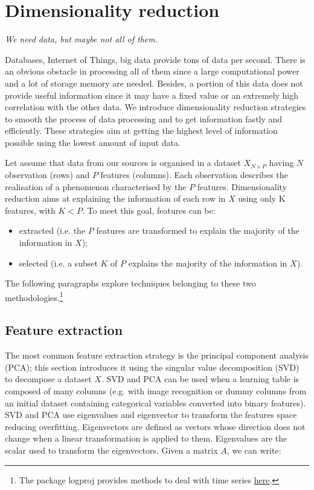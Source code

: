 \chapter{Dimensionality reduction}{}

\epigraph{\textit{We need data, but maybe not all of them.}}{}

Databases, Internet of Things, big data provide tons of data per second. There is an obvious obstacle in processing all of them since a large computational power and a lot of storage memory are needed. Besides, a portion of this data does not provide useful information since it may have a fixed value or an extremely high correlation with the other data. We introduce dimensionality reduction strategies to smooth the process of data processing and to get information fastly and efficiently. These strategies aim at getting the highest level of information possible using the lowest amount of input data.\par

Let assume that data from our sources is organised in a dataset $X_{N\times P}$ having $N$ observation (rows) and $P$ features (columns). Each observation describes the realisation of a phenomenon characterised by the $P$ features. Dimensionality reduction aims at explaining the information of each row in $X$ using only K features, with $K<P$. To meet this goal, features can be:

\begin{itemize}
    \item extracted (i.e. the $P$ features are transformed to explain the majority of the information in $X$);
    \item selected (i.e. a subset $K$ of $P$ explains the majority of the information in $X$). 
\end{itemize}

The following paragraphs explore techniques belonging to these two methodologies.\footnote{The package logproj provides methods to deal with time series \href{https://github.com/aletuf93/logproj/blob/master/logproj/ml_dimensionalityReduction.py}{here}.} 

\section{Feature extraction}
The most common feature extraction strategy is the principal component analysis (PCA); this section introduces it using the singular value decomposition (SVD) to decompose a dataset $X$. SVD and PCA can be used when a learning table is composed of many columns (e.g. with image recognition or dummy columns from an initial dataset containing categorical variables converted into binary features). SVD and PCA use eigenvalues and eigenvector to transform the features space reducing overfitting. Eigenvectors are defined as vectors whose direction does not change when a linear transformation is applied to them. Eigenvalues are the scalar used to transform the eigenvectors. Given a matrix $A$, we can write:

